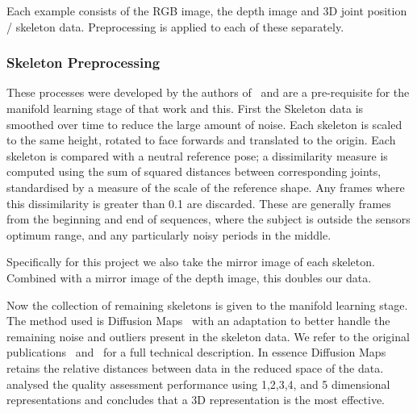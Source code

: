 \documentclass[11pt]{article} %
\begin{document}
Each example consists of the RGB image, the depth image and 3D joint position / skeleton data. Preprocessing is applied to each of these separately.

\subsubsection{Skeleton Preprocessing}
\label{sec:skelPreproc}

These processes were developed by the authors of~\cite{Paiement} and are a pre-requisite for the manifold learning stage of that work and this. First the Skeleton data is smoothed over time to reduce the large amount of noise. Each skeleton is scaled to the same height, rotated to face forwards and translated to the origin. Each skeleton is compared with a neutral reference pose;  a dissimilarity measure is computed  using the sum of squared distances between corresponding joints, standardised by a measure of the scale of the reference shape. Any frames where this dissimilarity is greater than 0.1 are discarded. These are generally frames from the beginning and end of sequences, where the subject is outside the sensors optimum range, and any particularly noisy periods in the middle. 

Specifically for this project we also take the mirror image of each skeleton. Combined with a mirror image of the depth image, this doubles our data. 

Now the collection of remaining skeletons is given to the manifold learning stage. The method used is Diffusion Maps~\cite{Coifman2006} with an adaptation to better handle the remaining noise and outliers present in the skeleton data. We refer to the original publications~\cite{Paiement} and~\cite{Tao} for a full technical description. In essence Diffusion Maps retains the relative distances between data in the reduced space of the data. \cite{Tao} analysed the quality assessment performance using 1,2,3,4, and 5 dimensional representations and concludes that a 3D representation is the most effective.
\end{document}
